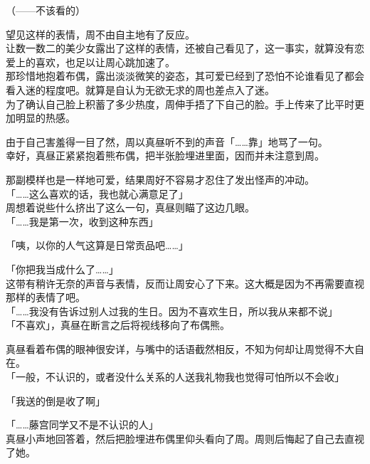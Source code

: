 （——不该看的）

望见这样的表情，周不由自主地有了反应。\\

让数一数二的美少女露出了这样的表情，还被自己看见了，这一事实，就算没有恋爱上的喜欢，也足以让周心跳加速了。\\

那珍惜地抱着布偶，露出淡淡微笑的姿态，其可爱已经到了恐怕不论谁看见了都会看入迷的程度吧。就算是自认为无欲无求的周也差点入了迷。\\

为了确认自己脸上积蓄了多少热度，周伸手捂了下自己的脸。手上传来了比平时更加明显的热感。

由于自己害羞得一目了然，周以真昼听不到的声音「……靠」地骂了一句。\\

幸好，真昼正紧紧抱着熊布偶，把半张脸埋进里面，因而并未注意到周。

那副模样也是一样地可爱，结果周好不容易才忍住了发出怪声的冲动。\\

「……这么喜欢的话，我也就心满意足了」\\

周想着说些什么挤出了这么一句，真昼则瞄了这边几眼。\\

「……我是第一次，收到这种东西」

「咦，以你的人气这算是日常贡品吧……」

「你把我当成什么了……」\\

这带有稍许无奈的声音与表情，反而让周安心了下来。这大概是因为不再需要直视那样的表情了吧。\\

「……我没有告诉过别人过我的生日。因为不喜欢生日，所以我从来都不说」\\

「不喜欢」，真昼在断言之后将视线移向了布偶熊。

真昼看着布偶的眼神很安详，与嘴中的话语截然相反，不知为何却让周觉得不大自在。\\

「一般，不认识的，或者没什么关系的人送我礼物我也觉得可怕所以不会收」

「我送的倒是收了啊」

「……藤宫同学又不是不认识的人」\\

真昼小声地回答着，然后把脸埋进布偶里仰头看向了周。周则后悔起了自己去直视了她。\\

